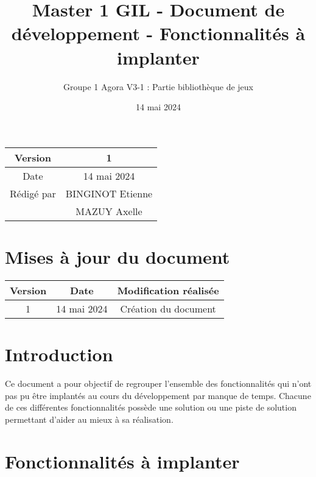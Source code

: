 \documentclass{article}
\title{Master 1 GIL - Document de développement - Fonctionnalités à implanter}
\author{Groupe 1 Agora V3-1 : Partie bibliothèque de jeux}
\date{14 mai 2024}
\begin{document}
\maketitle
    \begin{center}
        \begin{tabular}{|| c | c ||}
                \hline 
                Version & 1 \\
                \hline 
                Date & 14 mai 2024 \\
                \hline
                Rédigé par & BINGINOT Etienne\\
                & MAZUY Axelle\\
                \hline
        \end{tabular}
    \end{center}

    \newpage
    \section*{Mises à jour du document}

    \begin{center}
        \begin{tabular}{|| c | c | c ||}
                \hline 
                Version & Date & Modification réalisée \\
                \hline
                \hline 
                1 & 14 mai 2024 & Création du document \\
                \hline
        \end{tabular}
    \end{center}

    \newpage
    \tableofcontents
    \newpage

    \section{Introduction}

        Ce document a pour objectif de regrouper l'ensemble des fonctionnalités qui n'ont pas pu être implantés au cours du développement par manque de temps. Chacune de ces différentes fonctionnalités possède une solution ou une piste de solution permettant d'aider au mieux à sa réalisation.

    \section{Fonctionnalités à implanter}
\end{document}
